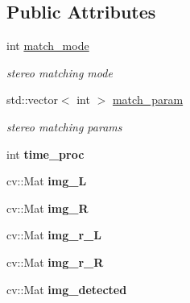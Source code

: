 \subsection*{Public Attributes}
\begin{DoxyCompactItemize}
\item 
\hypertarget{classstereo__vision_aa158a1bbe77e1a54958572daf0a4ae52}{}int \hyperlink{classstereo__vision_aa158a1bbe77e1a54958572daf0a4ae52}{match\+\_\+mode}\label{classstereo__vision_aa158a1bbe77e1a54958572daf0a4ae52}

\begin{DoxyCompactList}\small\item\em stereo matching mode \end{DoxyCompactList}\item 
\hypertarget{classstereo__vision_aac7f078a0eeff8e85540641628911a46}{}std\+::vector$<$ int $>$ \hyperlink{classstereo__vision_aac7f078a0eeff8e85540641628911a46}{match\+\_\+param}\label{classstereo__vision_aac7f078a0eeff8e85540641628911a46}

\begin{DoxyCompactList}\small\item\em stereo matching params \end{DoxyCompactList}\item 
\hypertarget{classstereo__vision_a43efac70e2402b96dc47994dab82eef5}{}int {\bfseries time\+\_\+proc}\label{classstereo__vision_a43efac70e2402b96dc47994dab82eef5}

\item 
\hypertarget{classstereo__vision_a6d6580405e25800cc97bf10cd2be6ca7}{}cv\+::\+Mat {\bfseries img\+\_\+\+L}\label{classstereo__vision_a6d6580405e25800cc97bf10cd2be6ca7}

\item 
\hypertarget{classstereo__vision_abbbb2e0ea2ea99867db15bc9f4e7b735}{}cv\+::\+Mat {\bfseries img\+\_\+\+R}\label{classstereo__vision_abbbb2e0ea2ea99867db15bc9f4e7b735}

\item 
\hypertarget{classstereo__vision_a208e506dc490cce114a66060515a31f3}{}cv\+::\+Mat {\bfseries img\+\_\+r\+\_\+\+L}\label{classstereo__vision_a208e506dc490cce114a66060515a31f3}

\item 
\hypertarget{classstereo__vision_aba439f3d27de41b4c199158479a88c27}{}cv\+::\+Mat {\bfseries img\+\_\+r\+\_\+\+R}\label{classstereo__vision_aba439f3d27de41b4c199158479a88c27}

\item 
\hypertarget{classstereo__vision_ae600652d57c3918068298f50d5862b1f}{}cv\+::\+Mat {\bfseries img\+\_\+detected}\label{classstereo__vision_ae600652d57c3918068298f50d5862b1f}


\end{DoxyCompactItemize}
